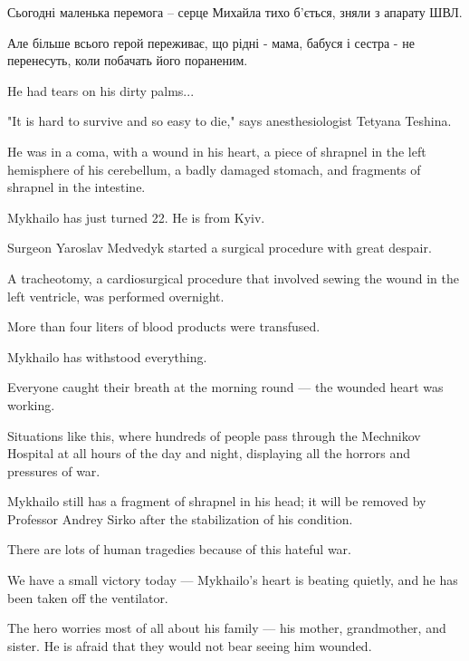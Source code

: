 Сьогодні маленька перемога – серце Михайла тихо б’ється, зняли з апарату ШВЛ.

Але більше всього герой переживає, що рідні - мама, бабуся і сестра - не
перенесуть, коли побачать його пораненим.

He had tears on his dirty palms...

"It is hard to survive and so easy to die,"  says anesthesiologist Tetyana
Teshina.

He was in a coma, with a wound in his heart, a piece of shrapnel in the left
hemisphere of his cerebellum, a badly damaged stomach, and fragments of
shrapnel in the intestine.

Mykhailo has just turned 22. He is from Kyiv.

Surgeon Yaroslav Medvedyk started a surgical procedure with great despair.

A tracheotomy, a cardiosurgical procedure that involved sewing the wound in the
left ventricle, was performed overnight.

More than four liters of blood products were transfused.

Mykhailo has withstood everything.

Everyone caught their breath at the morning round — the wounded heart was
working.

Situations like this, where hundreds of people pass through the Mechnikov
Hospital at all hours of the day and night, displaying all the horrors and
pressures of war.

Mykhailo still has a fragment of shrapnel in his head; it will be removed by
Professor Andrey Sirko after the stabilization of his condition.

There are lots of human tragedies because of this hateful war.

We have a small victory today — Mykhailo's heart is beating quietly, and he has
been taken off the ventilator.

The hero worries most of all about his family — his mother, grandmother, and
sister. He is afraid that they would not bear seeing him wounded.

